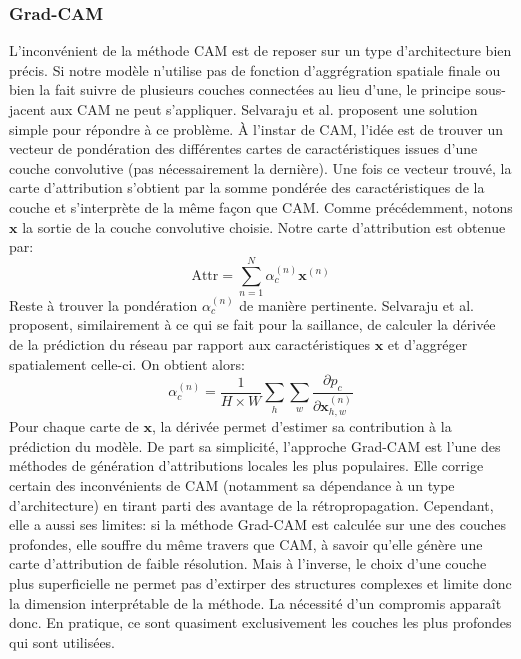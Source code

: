 \subsubsection{Grad-CAM}
L'inconvénient de la méthode CAM est de reposer sur un type d'architecture bien précis. Si notre modèle n'utilise pas de fonction d'aggrégration spatiale finale ou bien la fait suivre de plusieurs couches connectées au lieu d'une, le principe sous-jacent aux CAM ne peut s'appliquer. Selvaraju et al. \cite{selvarajuGradCAMVisualExplanations2017b} proposent une solution simple pour répondre à ce problème. À l'instar de CAM, l'idée est de trouver un vecteur de pondération des différentes cartes de caractéristiques issues d'une couche convolutive (pas nécessairement la dernière). Une fois ce vecteur trouvé, la carte d'attribution s'obtient par la somme pondérée des caractéristiques de la couche et s'interprète de la même façon que CAM.
Comme précédemment, notons $\mathbf{x}$ la sortie de la couche convolutive choisie. Notre carte d'attribution est obtenue par:
\begin{equation}
	\text{Attr} = \sum_{n=1}^{N} \alpha^{(n)}_c \mathbf{x}^{(n)}
\end{equation}
Reste à trouver la pondération $\alpha^{(n)}_c$ de manière pertinente. Selvaraju et al. proposent, similairement à ce qui se fait pour la saillance, de calculer la dérivée de la prédiction du réseau par rapport aux caractéristiques $\mathbf{x}$ et d'aggréger spatialement celle-ci. On obtient alors:
\begin{equation}
	\alpha^{(n)}_c =  \frac{1}{H \times W} \sum_{h} \sum_{w} \frac{\partial p_c}{\partial \mathbf{x}^{(n)}_{h, w}}
\end{equation}
Pour chaque carte de $\mathbf{x}$, la dérivée permet d'estimer sa contribution à la prédiction du modèle. 
De part sa simplicité, l'approche Grad-CAM est l'une des méthodes de génération d'attributions locales les plus populaires. Elle corrige certain des inconvénients de CAM (notamment sa dépendance à un type d'architecture) en tirant parti des avantage de la rétropropagation. Cependant, elle a aussi ses limites: si la méthode Grad-CAM est calculée sur une des couches profondes, elle souffre du même travers que CAM, à savoir qu'elle génère une carte d'attribution de faible résolution. Mais à l'inverse, le choix d'une couche plus superficielle ne permet pas d'extirper des structures complexes et limite donc la dimension interprétable de la méthode. La nécessité d'un compromis apparaît donc. En pratique, ce sont quasiment exclusivement les couches les plus profondes qui sont utilisées.

